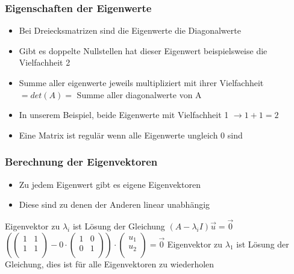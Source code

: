 \begin{frame}
    \frametitle{Eigenschaften der Eigenwerte}
    \begin{itemize}
        \item Bei Dreiecksmatrizen sind die Eigenwerte die Diagonalwerte
        \item Gibt es doppelte Nullstellen hat dieser Eigenwert beispielsweise die Vielfachheit 2
        \item  Summe aller eigenwerte jeweils multipliziert mit ihrer Vielfachheit $= det(A) =$ Summe aller diagonalwerte von A
        \item In unserem Beispiel, beide Eigenwerte mit Vielfachheit 1 $\rightarrow 1+1 = 2$
        \item Eine Matrix ist regulär wenn alle Eigenwerte ungleich 0 sind
    \end{itemize}
\end{frame}
\begin{frame}
    \frametitle{Berechnung der Eigenvektoren}
    \begin{itemize}
        \item Zu jedem Eigenwert gibt es eigene Eigenvektoren
        \item Diese sind zu denen der Anderen linear unabhängig
    \end{itemize}
    Eigenvektor zu $\lambda _{i}$ ist Lösung der Gleichung $(A - \lambda _{i} I) \vec{u} = \vec{0}$
    $(\begin{pmatrix}
        1 & 1 \\
        1 & 1 \\
    \end{pmatrix} - 0 \cdot \begin{pmatrix}
        1 & 0 \\
        0 & 1 \\
    \end{pmatrix}) \cdot \begin{pmatrix}
        u _{1} \\
        u _{2} \\
    \end{pmatrix} = \vec{0}$
    \newline
    Eigenvektor zu $\lambda _{1}$ ist Lösung der Gleichung, dies ist für alle Eigenvektoren zu wiederholen
\end{frame}

